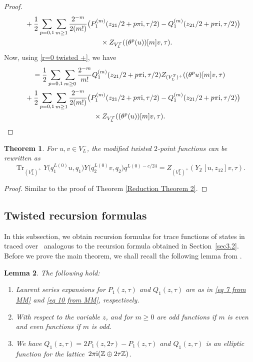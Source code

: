 \documentclass[pdftex]{sigma}
\numberwithin{equation}{section}
\newtheorem{Theorem}{Theorem}[section]
\newtheorem{Lemma}[Theorem]{Lemma}
\theoremstyle{definition}
\begin{document}
\begin{proof}
\begin{gather*}
\phantom{=}{}+\frac{1}{2}\sum_{p=0,1}\sum_{m\geq 1}\frac{2^{-m}}{2(m!)}\bigl( P_1^{(m)}(z_{21}/2+p\pi {\rm i},\tau/2)-Q_1^{(m)}(z_{21}/2+p\pi {\rm i},\tau/2)\bigr)\\
\phantom{=+}{}\times Z_{V_L^T}((\theta^p(u))[m]v, \tau).
\end{gather*}
Now, using \eqref{r=0 twisted +}, we have
\begin{gather*}
=\frac{1}{2}\sum_{p=0,1}\sum_{m\geq 0}\frac{2^{-m}}{m!} Q_1^{(m)}(z_{21}/2+p\pi {\rm i},\tau/2) Z_{(V_L^T)^+}((\theta^pu)[m]v,\tau)\\
\phantom{=}{}+\frac{1}{2}\sum_{p=0,1}\sum_{m\geq 1}\frac{2^{-m}}{2(m!)}\bigl( P_1^{(m)}(z_{21}/2+p\pi {\rm i},\tau/2)-Q_1^{(m)}(z_{21}/2+p\pi {\rm i},\tau/2)\bigr)\\
\phantom{=+}{}\times Z_{V_L^T}((\theta^p(u))[m]v, \tau).\tag*{\qed}
\end{gather*}\renewcommand{\qed}{}
\end{proof}

\begin{Theorem}\label{Z2 Twisted+- Reduction Theorem 2}
 For $u,v\in V_L^-$, the modified twisted $2$-point functions can be rewritten as
 \[\operatorname{Tr}_{(V_L^T)^+}Y\bigl(q_1^{L(0)}u,q_1\bigr)Y\bigl(q_2^{L(0)}v,q_2\bigr)q^{L(0)-c/24}=Z_{(V_L^T)^+}(Y_{\mathbb{Z}}[u,z_{12}]v,\tau).\]
\end{Theorem}

\begin{proof}
 Similar to the proof of Theorem \ref{Reduction Theorem 2}.
\end{proof}

\subsection{Twisted recursion formulas}

In this subsection, we obtain recursion formulas for trace functions of states in  traced over~ analogous to the recursion formula obtained in Section~\ref{sec3.2}. Before we prove the main theorem, we shall recall the following lemma from \cite[Lemma 3]{Mason20231-PointAlgebras}.

\begin{Lemma}\label{Lemma 3 from MM}
 The following hold:
\begin{enumerate}\itemsep=0pt
\item[$(1)$] Laurent series expansions for $P_1(z,\tau)$ and $Q_1(z,\tau)$ are as in \eqref{eq 7 from MM} and \eqref{eq 10 from MM}, respectively.
\item[$(2)$] With respect to the variable $z$,  and  for $m\geq 0$ are odd functions if $m$ is even and even functions if $m$ is odd.
\item[$(3)$] We have $Q_1(z,\tau)=2P_1(z,2\tau)-P_1(z,\tau)$ and $Q_1(z,\tau)$ is an elliptic function for the lattice~${2\pi {\rm i}(\mathbb{Z}\oplus 2\tau\mathbb{Z})}$.
 \end{enumerate}
\end{Lemma}
\end{document}
